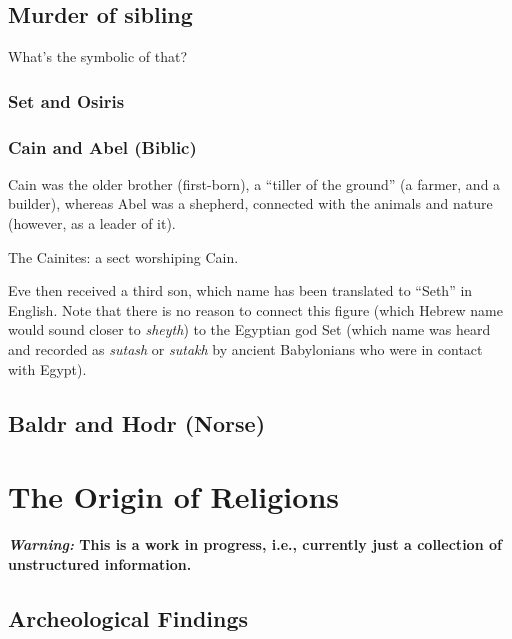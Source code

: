 \documentclass[
]{book}
\begin{document}
\hypertarget{murder-of-sibling}{%
\section{Murder of sibling}\label{murder-of-sibling}}

What's the symbolic of that?

\hypertarget{set-and-osiris}{%
\subsection{Set and Osiris}\label{set-and-osiris}}

\hypertarget{cain-and-abel-biblic}{%
\subsection{Cain and Abel (Biblic)}\label{cain-and-abel-biblic}}

Cain was the older brother (first-born), a ``tiller of the ground'' (a farmer, and a builder), whereas Abel was a shepherd, connected with the animals and nature (however, as a leader of it).

The Cainites: a sect worshiping Cain.

Eve then received a third son, which name has been translated to ``Seth'' in English. Note that there is no reason to connect this figure (which Hebrew name would sound closer to \emph{sheyth}) to the Egyptian god Set (which name was heard and recorded as \emph{sutash} or \emph{sutakh} by ancient Babylonians who were in contact with Egypt).

\hypertarget{baldr-and-hodr-norse}{%
\section{Baldr and Hodr (Norse)}\label{baldr-and-hodr-norse}}

\hypertarget{the-origin-of-religions}{%
\chapter{The Origin of Religions}\label{the-origin-of-religions}}

\textbf{\emph{Warning:} This is a work in progress, i.e., currently just a collection of unstructured information.}

\hypertarget{archeological-findings}{%
\section{Archeological Findings}\label{archeological-findings}}
\end{document}
